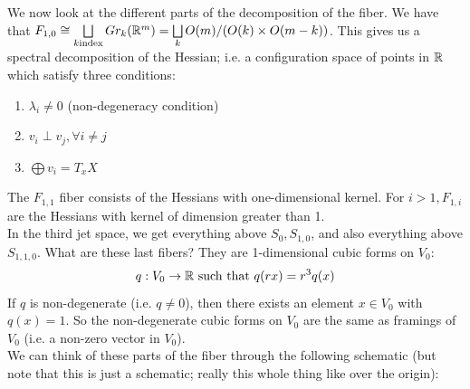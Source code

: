 \documentclass{article}
\newtheorem{proposed work}[theorem]{Proposed Work}
\begin{document}
We now look at the different parts of the decomposition of the fiber. We have that $F_{1,0}\cong \bigsqcup\limits_{k \text{index}} Gr_k(\mathbb R^m)=\bigsqcup\limits_{k}O(m)/(O(k)\times O(m-k))$. This gives us a spectral decomposition of the Hessian; i.e. a configuration space of points in $\mathbb R$ which satisfy three conditions:
\begin{enumerate}
\item $\lambda_i\neq 0$ (non-degeneracy condition)
\item $v_i\perp v_j, \forall i\neq j$
\item $\bigoplus v_i=T_xX$
\end{enumerate}
\begin{center}
\end{center}

The $F_{1,1}$ fiber consists of the Hessians with one-dimensional kernel. For $i>1, F_{1,i}$ are the Hessians with kernel of dimension greater than 1. \\

In the third jet space, we get everything above $S_0, S_{1,0}$, and also everything above $S_{1,1,0}$. What are these last fibers? They are 1-dimensional cubic forms on $V_0$: 
$$q:V_0\to \mathbb R \text{ such that } q(rx)=r^3q(x)$$
If $q$ is non-degenerate (i.e. $q\neq 0$), then there exists an element $x\in V_0$ with $q(x)=1$. So the non-degenerate cubic forms on $V_0$ are the same as framings of $V_0$ (i.e. a non-zero vector in $V_0$).\\

We can think of these parts of the fiber through the following schematic (but note that this is just a schematic; really this whole thing like over the origin):\\
\begin{center}
\end{center}
\end{document}
